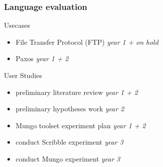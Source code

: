 \begin{frame}\frametitle{Language evaluation}
  \begin{alertblock}{Usecases}
  \begin{itemize}
    \item File Transfer Protocol (FTP) \hfill  \textit{year 1 + on hold}
    \item Paxos \hfill  \textit{year 1 + 2}
  \end{itemize}
\end{alertblock}


\begin{alertblock}{User Studies}
  \begin{itemize}
    \item preliminary literature review \hfill  \textit{year 1 + 2}
    \item preliminary hypotheses work \hfill  \textit{year 2}
    \item Mungo toolset experiment plan \hfill  \textit{year 1 + 2}
    \item conduct Scribble experiment \hfill  \textit{year 3}
    \item conduct Mungo experiment \hfill  \textit{year 3}
  \end{itemize}
\end{alertblock}

\end{frame}
